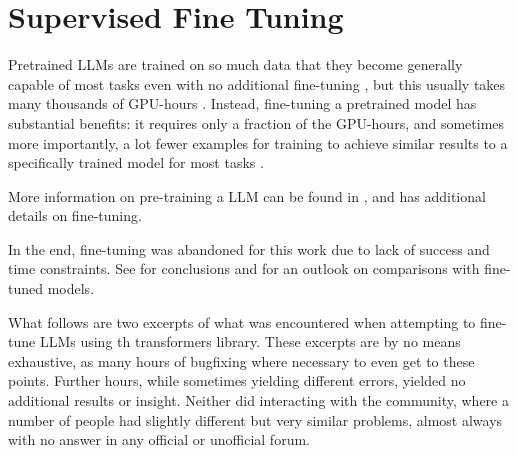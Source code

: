 


\section{Supervised Fine Tuning}\label{sec:res:sft}
Pretrained \glspl{LLM} are trained on so much data that they become generally capable of most tasks even with no additional fine-tuning \cite{brown_language_2020}, but this usually takes many thousands of GPU-hours \cite{touvron_llama_2023, scao_what_2022}.
Instead, fine-tuning a pretrained model has substantial benefits: it requires only a fraction of the GPU-hours, and sometimes more importantly, a lot fewer examples for training to achieve similar results to a specifically trained model for most tasks \cite{gaddipati_comparative_2020}.

More information on pre-training a \gls{LLM} can be found in , and  has additional details on fine-tuning.

In the end, fine-tuning was abandoned for this work due to lack of success and time constraints. See  for conclusions and  for an outlook on comparisons with fine-tuned models.

What follows are two excerpts of what was encountered when attempting to fine-tune \glspl{LLM} using th \gls{transformers} library.
These excerpts are by no means exhaustive, as many hours of bugfixing where necessary to even get to these points.
Further hours, while sometimes yielding different errors, yielded no additional results or insight.
Neither did interacting with the community, where a number of people had slightly different but very similar problems, almost always with no answer in any official or unofficial forum.

%


